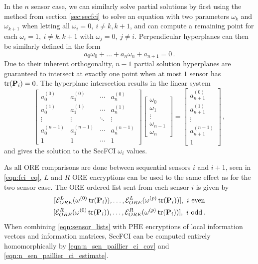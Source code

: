 \documentclass[letterpaper, 10 pt, conference]{ieeeconf}  %
\begin{document}
In the $n$ sensor case, we can similarly solve partial solutions by first using the method from section \ref{sec:secfci} to solve an equation with two parameters $\omega_k$ and $\omega_{k+1}$ when letting all $\omega_i=0,\ i\neq k,k+1$, and can compute a remaining point for each $\omega_i=1,\ i\neq k,k+1$ with $\omega_j=0,\ j\neq i$. Perpendicular hyperplanes can then be similarly defined in the form 
\begin{equation}
   a_0\omega_0 + \dots +a_n\omega_n + a_{n+1} = 0\,. \label{eqn:nsen_plane_eq}
\end{equation}
Due to their inherent orthogonality, $n-1$ partial solution hyperplanes are guaranteed to intersect at exactly one point when at most $1$ sensor has $\operatorname{tr}({{\mathbf{P}}}_i)=0$. The hyperplane intersection results in the linear system 
\begin{equation}
   \begin{bmatrix}
      a_0^{(0)} & a_1^{(0)} & \cdots & a_n^{(0)} \\
      a_0^{(1)} & a_1^{(1)} & \cdots & a_n^{(1)} \\
      \vdots & \vdots & \ddots & \vdots \\
      a_0^{(n-1)} & a_1^{(n-1)} & \cdots & a_n^{(n-1)} \\
      1 & 1 & \cdots & 1
   \end{bmatrix}
   \begin{bmatrix}
      \omega_0 \\
      \omega_1 \\
      \vdots \\
      \omega_{n-1} \\
      \omega_n
   \end{bmatrix}
   =
   \begin{bmatrix}
      a_{n+1}^{(0)} \\
      a_{n+1}^{(1)} \\
      \vdots \\
      a_{n+1}^{(n-1)} \\
      1
   \end{bmatrix}\,, \label{eqn:hyperplane_sol_eq}
\end{equation}
and gives the solution to the SecFCI $\omega_i$ values.

As all ORE comparisons are done between sequential sensors $i$ and $i+1$, seen in \eqref{eqn:fci_eq}, $L$ and $R$ ORE encryptions can be used to the same effect as for the two sensor case. The ORE ordered list sent from each sensor $i$ is given by
\begin{equation}
   \begin{gathered} \label{eqn:sensor_lists}
      [\mathcal{E}^L_{ORE}(\omega^{(0)}\tr(\mP_i)),\dots,\mathcal{E}^L_{ORE}(\omega^{(p)}\tr(\mP_i))],\ i\text{ even} \\
      [\mathcal{E}^R_{ORE}(\omega^{(0)}\tr(\mP_i)),\dots,\mathcal{E}^R_{ORE}(\omega^{(p)}\tr(\mP_i))],\ i\text{ odd}\,.
   \end{gathered}
\end{equation}
When combining \eqref{eqn:sensor_lists} with PHE encryptions of local information vectors and information matrices, SecFCI can be computed entirely homomorphically by \eqref{eqn:n_sen_paillier_ci_cov} and \eqref{eqn:n_sen_paillier_ci_estimate}.
\end{document}
